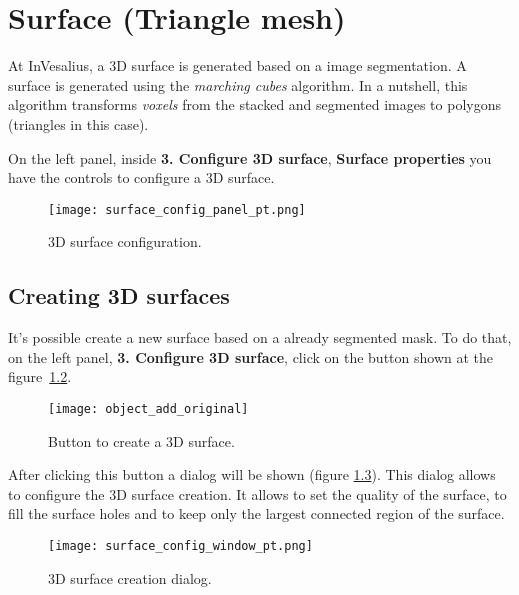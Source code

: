 \chapter{Surface (Triangle mesh)}
\label{cap_surface}

At InVesalius, a 3D surface is generated based on a image segmentation. A surface is generated using the \textit{marching cubes} algorithm. In a nutshell, this algorithm transforms \textit{voxels} from the stacked and segmented images to polygons (triangles in this case).

On the left panel, inside \textbf{3. Configure 3D surface}, \textbf{Surface properties} you have the controls to configure a 3D surface.

\begin{figure}[!htb]
\centering
\texttt{[image: surface\_config\_panel\_pt.png]}
\caption{3D surface configuration.}
\label{fig:3d_surface_managment}
\end{figure}


\section{Creating 3D surfaces}

It's possible create a new surface based on a already segmented mask. To do that, on the left panel, \textbf{3. Configure 3D surface}, click on the button shown at the figure~\ref{fig:shortcut_new_surface}.

\begin{figure}[!htb]
\centering
\texttt{[image: object\_add\_original]}
\caption{Button to create a 3D surface.}
\label{fig:shortcut_new_surface}
\end{figure}

After clicking this button a dialog will be shown (figure \ref{fig:create_surface_1}). This dialog allows to configure the 3D surface creation. It allows to set the quality of the surface, to fill the surface holes and to keep only the largest connected region of the surface.

\begin{figure}[!htb]
\centering
\texttt{[image: surface\_config\_window\_pt.png]}
\caption{3D surface creation dialog.}
\label{fig:create_surface_1}
\end{figure}


